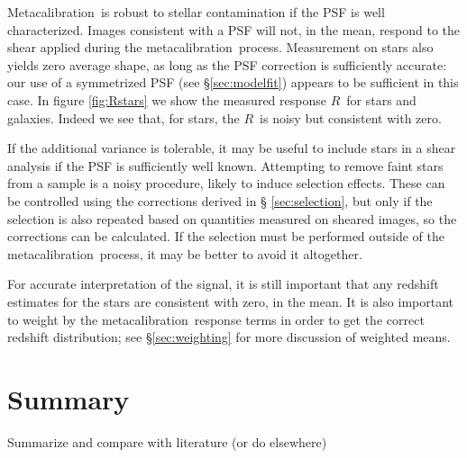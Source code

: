 \documentclass[a4paper,fleqn,usenatbib]{mnras}
\newcommand{\mcal}{metacalibration}
\newcommand{\Mcal}{Metacalibration}
\newcommand{\mcalR}{$R$}
\newcommand{\nsimNStar}{$5.6 \times 10^8$}
\newcommand{\nsimNstarperc}{10\%}
\newcommand{\bdsim}{\texttt{BDK}}
\newcommand{\bdstar}{\texttt{BDK+Stars}}
\begin{document}

\Mcal\ is robust to stellar contamination if the PSF is well
characterized.  Images consistent with a PSF will not, in the mean, respond to the shear
applied during the \mcal\ process.  Measurement on stars also yields zero average shape, as
long as the PSF correction is sufficiently accurate: our use of a symmetrized
PSF (see \S \ref{sec:modelfit}) appears to be sufficient in this case.
In figure \ref{fig:Rstars} we show the measured response \mcalR\ for stars and
galaxies.  Indeed we see that, for stars, the \mcalR\ is noisy but consistent
with zero.

If the additional variance is tolerable, it may be useful to include stars in a
shear analysis if the PSF is sufficiently well known.  Attempting to remove
faint stars from a sample is a noisy procedure, likely to induce selection
effects.  These can be controlled using the corrections derived in \S
\ref{sec:selection}, but only if the selection is also repeated based on
quantities measured on sheared images, so the corrections can be calculated.
If the selection must be performed outside of the \mcal\ process, it may be
better to avoid it altogether.

For accurate interpretation of the signal, it is still important that any
redshift estimates for the stars are consistent with zero, in the mean. It is
also important to weight by the \mcal\ response terms in order to get the
correct redshift distribution; see \S \ref{sec:weighting} for more
discussion of weighted means.

\section{Summary}

Summarize and compare with literature (or do elsewhere)

\end{document}

